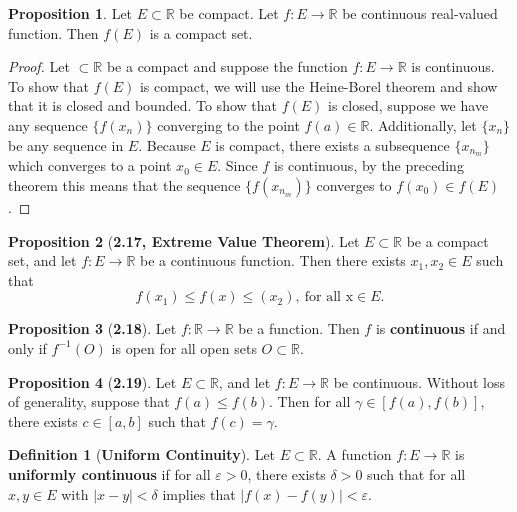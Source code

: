 \documentclass[12pt]{article}
\newcommand{\R}{\mathbb{R}}
\renewcommand{\epsilon}{\varepsilon}
\theoremstyle{definition}
\newtheorem*{definition}{Definition}
\newtheorem*{prop}{Proposition}
\begin{document}
\begin{prop}
    Let \( E \subset \R \) be compact. Let \( f: E \to \R \) be continuous real-valued function. Then \( f(E) \) is a compact set. 

    \begin{proof}
        Let \( \subset \R \) be a compact and suppose the function \( f: E \to \R \) is continuous. To show that \( f(E) \) is compact, we will use the Heine-Borel theorem and show that it is closed and bounded. To show that \( f(E) \) is closed, suppose we have any sequence \( \{ f(x_n) \} \) converging to the point \( f(a) \in \R \). Additionally, let \( \{ x_n \} \) be any sequence in \( E \). Because \( E \) is compact, there exists a subsequence \( \{ x_{n_{m}} \}\) which converges to a point \( x_0 \in E \). Since \( f \) is continuous, by the preceding theorem this means that the sequence \( \{ f(x_{n_{m}} )\} \) converges to \( f(x_{0}) \in f(E) \).
    \end{proof}
\end{prop}

\begin{prop}[\textbf{2.17, Extreme Value Theorem}]

    Let \( E \subset \R \) be a compact set, and let \( f: E \to \R \) be a continuous function. Then there exists \( x_1, x_2 \in E \) such that
        \[
            f(x_1) \leq f(x) \leq (x_2), \ \text{for all x} \in E.  
        \] 
    
\end{prop}

\begin{prop}[\textbf{2.18}]

    Let \( f: \R \to \R \) be a function. Then \( f \) is \textbf{continuous} if and only if \( f^{-1}(O) \) is open for all open sets \( O \subset \R \).
    
\end{prop}

\begin{prop}[\textbf{2.19}]

    Let \( E \subset \R \), and let \( f: E \to \R \) be continuous. Without loss of generality, suppose that \( f(a) \leq f(b) \). Then for all \( \gamma \in [f(a), f(b)] \), there exists \( c \in [a, b] \) such that \( f(c) = \gamma \).
    
\end{prop}

\begin{definition}[\textbf{Uniform Continuity}]

    Let \( E \subset \R \). A function \( f: E \to \R \) is \textbf{uniformly continuous} if for all \( \epsilon > 0 \), there exists \( \delta > 0 \) such that for all \( x, y \in E \) with \( |x - y| < \delta \) implies that \( |f(x) - f(y)| < \epsilon \).
    
\end{definition}
\end{document}
